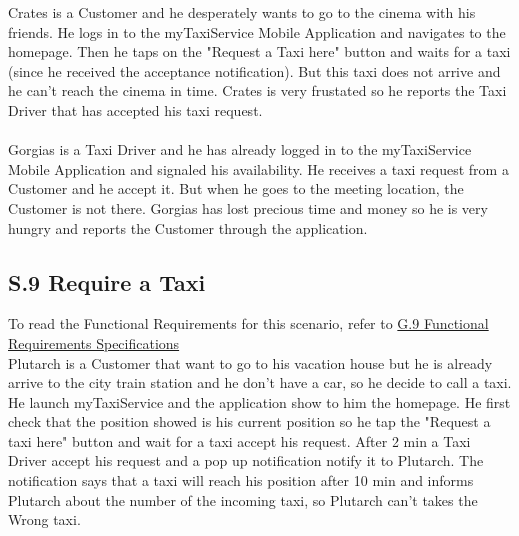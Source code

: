		\label{sec:TaxiDriverReportingScenario}
		Crates is a Customer and he desperately wants to go to the cinema with his friends. He logs in to the myTaxiService Mobile Application and navigates to the homepage. Then he taps on the "Request a Taxi here" button and waits for a taxi (since he received the acceptance notification). But this taxi does not arrive and he can't reach the cinema in time. Crates is very frustated so he reports the Taxi Driver that has accepted his taxi request.
		\\
		\\
		\label{sec:CustomerReportingScenario}
		Gorgias is a Taxi Driver and he has already logged in to the myTaxiService Mobile Application and signaled his availability. He receives a taxi request from a Customer and he accept it. But when he goes to the meeting location, the Customer is not there. Gorgias has lost precious time and money so he is very hungry and reports the Customer through the application. 
		
		\subsection{S.9 Require a Taxi}\label{sec:TaxiRequiringScenario}
		To read the Functional Requirements for this scenario, refer to \hyperref[sec:frs9]{G.9 Functional Requirements Specifications}\\
		Plutarch is a Customer that want to go to his vacation house but he is already arrive to the city train station and he don't have a car, so he decide to call a taxi. He launch myTaxiService and the application show to him the homepage. He first check that the position showed is his current position so he tap the "Request a taxi here" button and wait for a taxi accept his request. After 2 min a Taxi Driver accept his request and a pop up notification notify it to Plutarch. The notification says that a taxi will reach his position after 10 min and informs Plutarch about the number of the incoming taxi, so Plutarch can't takes the Wrong taxi.
		
		
